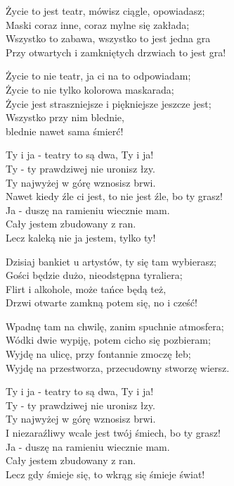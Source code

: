 \begin{text}
    Życie to jest teatr, mówisz ciągle, opowiadasz;\\
    Maski coraz inne, coraz mylne się zakłada;\\
    Wszystko to zabawa, wszystko to jest jedna gra\\
    Przy otwartych i zamkniętych drzwiach to jest gra!

    Życie to nie teatr, ja ci na to odpowiadam;\\
    Życie to nie tylko kolorowa maskarada;\\
    Życie jest straszniejsze i piękniejsze jeszcze jest;\\
    Wszystko przy nim blednie,\\
    blednie nawet sama śmierć!

    Ty i ja - teatry to są dwa, Ty i ja!\\
    Ty - ty prawdziwej nie uronisz łzy.\\
    Ty najwyżej w górę wznosisz brwi.\\
    Nawet kiedy źle ci jest, to nie jest źle, bo ty grasz!\\
    Ja - duszę na ramieniu wiecznie mam.\\
    Cały jestem zbudowany z ran.\\
    Lecz kaleką nie ja jestem, tylko ty!

    Dzisiaj bankiet u artystów, ty się tam wybierasz;\\
    Gości będzie dużo, nieodstępna tyraliera;\\
    Flirt i alkohole, może tańce będą też,\\
    Drzwi otwarte zamkną potem się, no i cześć!

    Wpadnę tam na chwilę, zanim spuchnie atmosfera;\\
    Wódki dwie wypiję, potem cicho się pozbieram;\\
    Wyjdę na ulicę, przy fontannie zmoczę łeb;\\
    Wyjdę na przestworza, przecudowny stworzę wiersz.

    Ty i ja - teatry to są dwa, Ty i ja!\\
    Ty - ty prawdziwej nie uronisz łzy.\\
    Ty najwyżej w górę wznosisz brwi.\\
    I niezaraźliwy wcale jest twój śmiech, bo ty grasz!\\
    Ja - duszę na ramieniu wiecznie mam.\\
    Cały jestem zbudowany z ran.\\
    Lecz gdy śmieje się, to wkrąg się śmieje świat!
\end{text}
